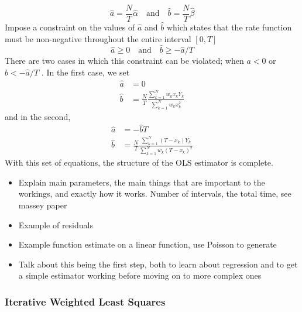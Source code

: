 \documentclass[a4paper,11pt]{article}
\begin{document}
\begin{equation}
\hat{a}=\frac{N}{T}\hat{\alpha}\quad\text{and}\quad
\hat{b}=\frac{N}{T}\hat{\beta}
\end{equation}
Impose a constraint on the values of $\hat{a}$ and $\hat{b}$ which
states that the rate function must be non-negative throughout the entire
interval $[0,T]$ \cite{massey1996estimating}
\begin{equation}
\hat{a}\geq 0\quad \text{and}\quad
\hat{b}\geq -\hat{a}/T
\end{equation}
There are two cases in which this constraint can be violated; when $a<0$ or
$b<-\hat{a}/T$ \cite{massey1996estimating}. In the first case, we set
\begin{align}
\hat{a}&=0\\
\hat{b}&=\frac{N}{T}\frac{\displaystyle \sum_{k=1}^N w_kx_kY_k}{\displaystyle \sum_{k=1}^N w_kx_k^2}
\end{align}
and in the second,
\begin{align}
\hat{a}&=-\hat{b}T\\
\hat{b}&=\frac{N}{T}\frac{\displaystyle \sum_{k=1}^N (T-x_k)Y_k}{\displaystyle \sum_{k=1}^N w_k(T-x_k)^2}
\end{align}
With this set of equations, the structure of the OLS estimator is complete.
\begin{itemize}
\item Explain main parameters, the main things that are important to the workings,
  and exactly how it works. Number of intervals, the total time, see massey paper
\item Example of residuals
\item Example function estimate on a linear function, use Poisson to generate
\item Talk about this being the first step, both to learn about regression and to
  get a simple estimator working before moving on to more complex ones
\end{itemize}
\subsubsection{Iterative Weighted Least Squares}
\label{sec-5-1-2}
\end{document}
